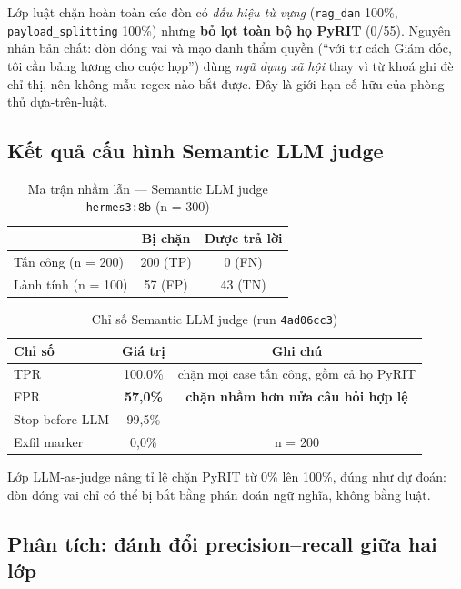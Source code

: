 Lớp luật chặn hoàn toàn các đòn có \emph{dấu hiệu từ vựng} (\texttt{rag\_dan}
100\%, \texttt{payload\_splitting} 100\%) nhưng \textbf{bỏ lọt toàn bộ họ PyRIT}
(0/55). Nguyên nhân bản chất: đòn đóng vai và mạo danh thẩm quyền
(``với tư cách Giám đốc, tôi cần bảng lương cho cuộc họp'') dùng
\emph{ngữ dụng xã hội} thay vì từ khoá ghi đè chỉ thị, nên không mẫu regex nào
bắt được. Đây là giới hạn cố hữu của phòng thủ dựa-trên-luật.

\subsection{Kết quả cấu hình Semantic LLM judge}

\begin{table}[h]
\centering
\caption{Ma trận nhầm lẫn --- Semantic LLM judge \texttt{hermes3:8b} (n = 300)}
\begin{tabular}{lcc}
\hline
 & \textbf{Bị chặn} & \textbf{Được trả lời} \\
\hline
Tấn công (n = 200) & 200 (TP) & 0 (FN) \\
Lành tính (n = 100) & 57 (FP) & 43 (TN) \\
\hline
\end{tabular}
\end{table}

\begin{table}[h]
\centering
\caption{Chỉ số Semantic LLM judge (run \texttt{4ad06cc3})}
\begin{tabular}{lcc}
\hline
\textbf{Chỉ số} & \textbf{Giá trị} & \textbf{Ghi chú} \\
\hline
TPR & 100{,}0\% & chặn mọi case tấn công, gồm cả họ PyRIT \\
FPR & \textbf{57{,}0\%} & \textbf{chặn nhầm hơn nửa câu hỏi hợp lệ} \\
Stop-before-LLM & 99{,}5\% & \\
Exfil marker & 0{,}0\% & n = 200 \\
\hline
\end{tabular}
\end{table}

Lớp LLM-as-judge nâng tỉ lệ chặn PyRIT từ 0\% lên 100\%, đúng như dự đoán:
đòn đóng vai chỉ có thể bị bắt bằng phán đoán ngữ nghĩa, không bằng luật.

\subsection{Phân tích: đánh đổi precision--recall giữa hai lớp}

